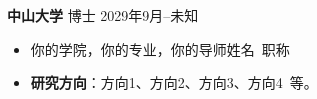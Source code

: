 \documentclass[11pt]{article}
\begin{document}
\begin{minipage}[t]{0.78\textwidth}
\begin{minipage}[t]{\textwidth}
        \vspace{0.5em}
        {\large \textbf{中山大学}} 博士 \hfill 2029年9月--未知
        \begin{itemize}
            \item 你的学院，你的专业，你的导师姓名\ 职称
            \item \textbf{研究方向}：方向1、方向2、方向3、方向4\ 等。
        \end{itemize}
        
        \vspace{1.2em}
        \end{minipage}
    \end{minipage}
    \hfill
    \begin{minipage}[t]{0.2\textwidth}
        \vspace{2em} %
        \setlength{\fboxsep}{0pt}
    \end{minipage}
\end{document}
